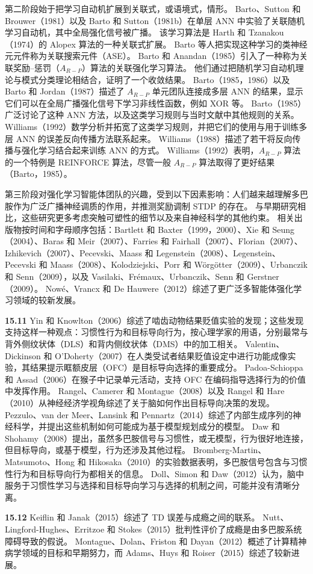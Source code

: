 \documentclass[UTF8, 12pt, fontset=fandol, oneside]{ctexart}
\begin{document}
第二阶段始于把学习自动机扩展到关联式，或语境式，情形。
Barto、Sutton 和 Brouwer（1981）以及 Barto 和 Sutton（1981b）在单层 ANN 中实验了关联随机学习自动机，其中全局强化信号被广播。
该学习算法是 Harth 和 Tzanakou（1974）的 Alopex 算法的一种关联式扩展。
Barto 等人把实现这种学习的类神经元元件称为关联搜索元件（ASE）。
Barto 和 Anandan（1985）引入了一种称为关联奖励--惩罚（$A_{R-P}$）算法的关联强化学习算法。
他们通过把随机学习自动机理论与模式分类理论相结合，证明了一个收敛结果。
Barto（1985，1986）以及 Barto 和 Jordan（1987）描述了 $A_{R-P}$ 单元团队连接成多层 ANN 的结果，显示它们可以在全局广播强化信号下学习非线性函数，例如 XOR 等。
Barto（1985）广泛讨论了这种 ANN 方法，以及这类学习规则与当时文献中其他规则的关系。
Williams（1992）数学分析并拓宽了这类学习规则，并把它们的使用与用于训练多层 ANN 的误差反向传播方法联系起来。
Williams（1988）描述了若干将反向传播与强化学习结合起来训练 ANN 的方式。
Williams（1992）表明，$A_{R-P}$ 算法的一个特例是 REINFORCE 算法，尽管一般 $A_{R-P}$ 算法取得了更好结果（Barto，1985）。

第三阶段对强化学习智能体团队的兴趣，受到以下因素影响：人们越来越理解多巴胺作为广泛广播神经调质的作用，并推测奖励调制 STDP 的存在。
与早期研究相比，这些研究更多考虑突触可塑性的细节以及来自神经科学的其他约束。
相关出版物按时间和字母顺序包括：Bartlett 和 Baxter（1999，2000）、Xie 和 Seung（2004）、Baras 和 Meir（2007）、Farries 和 Fairhall（2007）、Florian（2007）、Izhikevich（2007）、Pecevski、Maass 和 Legenstein（2008）、Legenstein、Pecevski 和 Maass（2008）、Kolodziejski、Porr 和 Wörgötter（2009）、Urbanczik 和 Senn（2009），以及 Vasilaki、Frémaux、Urbanczik、Senn 和 Gerstner（2009）。
Nowé、Vrancx 和 De Hauwere（2012）综述了更广泛多智能体强化学习领域的较新发展。

\noindent\textbf{15.11}
Yin 和 Knowlton（2006）综述了啮齿动物结果贬值实验的发现；这些发现支持这样一种观点：习惯性行为和目标导向行为，按心理学家的用语，分别最常与背外侧纹状体（DLS）和背内侧纹状体（DMS）中的加工相关。
Valentin、Dickinson 和 O'Doherty（2007）在人类受试者结果贬值设定中进行功能成像实验，其结果提示眶额皮层（OFC）是目标导向选择的重要成分。
Padoa-Schioppa 和 Assad（2006）在猴子中记录单元活动，支持 OFC 在编码指导选择行为的价值中发挥作用。
Rangel、Camerer 和 Montague（2008）以及 Rangel 和 Hare（2010）从神经经济学视角综述了关于脑如何作出目标导向决策的发现。
Pezzulo、van der Meer、Lansink 和 Pennartz（2014）综述了内部生成序列的神经科学，并提出这些机制如何可能成为基于模型规划成分的模型。
Daw 和 Shohamy（2008）提出，虽然多巴胺信号与习惯性，或无模型，行为很好地连接，但目标导向，或基于模型，行为还涉及其他过程。
Bromberg-Martin、Matsumoto、Hong 和 Hikosaka（2010）的实验数据表明，多巴胺信号包含与习惯性行为和目标导向行为都相关的信息。
Doll、Simon 和 Daw（2012）认为，脑中服务于习惯性学习与选择和目标导向学习与选择的机制之间，可能并没有清晰分离。

\noindent\textbf{15.12}
Keiflin 和 Janak（2015）综述了 TD 误差与成瘾之间的联系。
Nutt、Lingford-Hughes、Erritzoe 和 Stokes（2015）批判性评价了成瘾是由多巴胺系统障碍导致的假说。
Montague、Dolan、Friston 和 Dayan（2012）概述了计算精神病学领域的目标和早期努力，而 Adams、Huys 和 Roiser（2015）综述了较新进展。
\end{document}
